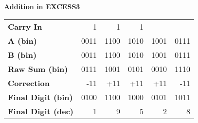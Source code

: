 \textbf{Addition in EXCESS3}
\vspace{0.3cm}

\begin{tabular}{l|rrrrr}
\textbf{Carry In} &  {\scriptsize 1}  &  {\scriptsize 1}  &  {\scriptsize 1}  &  {\scriptsize }  &  {\scriptsize }  \\
\textbf{A (bin)} &  0011  &  1100  &  1010  &  1001  &  0111  \\
\textbf{B (bin)} &  0011  &  1100  &  1010  &  1001  &  0111 \\\hline

\textbf{Raw Sum (bin)} &  0111  &  1001  &  0101  &  0010  &  1110  \\
\textbf{Correction} &  -11  &  +11  &  +11  &  +11  &  -11  \\
\hline

\textbf{Final Digit (bin)} &  0100  &  1100  &  1000  &  0101  &  1011  \\
\textbf{Final Digit (dec)} &  1  &  9  &  5  &  2  &  8  \\
\end{tabular}












\pagebreak